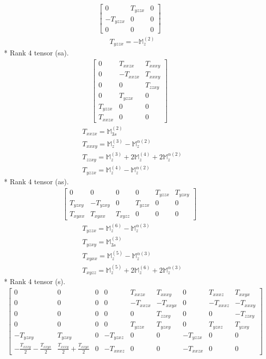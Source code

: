 \documentclass[fleqn,8pt,landscape]{jsarticle}
\begin{document}
\begin{align*}
\begin{bmatrix} 0 & T_{yzzx} & 0 \\ - T_{yzzx} & 0 & 0 \\ 0 & 0 & 0 \end{bmatrix}
\end{align*}
\begin{align*}
& T_{yzzx} = - \mathbb{M}_{z}^{(2)}
\end{align*}
* Rank 4 tensor (sa).
\begin{align*}
\begin{bmatrix} 0 & T_{xxzx} & T_{xxxy} \\ 0 & - T_{xxzx} & T_{xxxy} \\ 0 & 0 & T_{zzxy} \\ 0 & T_{yzzx} & 0 \\ T_{yzzx} & 0 & 0 \\ T_{xxzx} & 0 & 0 \end{bmatrix}
\end{align*}
\begin{align*}
& T_{xxzx} = \mathbb{M}_{3s}^{(2)} \\
& T_{xxxy} = \mathbb{M}_{z}^{(3)} - \mathbb{M}_{z}^{\alpha(2)} \\
& T_{zzxy} = \mathbb{M}_{z}^{(3)} + 2 \mathbb{M}_{z}^{(4)} + 2 \mathbb{M}_{z}^{\alpha(2)} \\
& T_{yzzx} = \mathbb{M}_{z}^{(4)} - \mathbb{M}_{z}^{\alpha(2)}
\end{align*}
* Rank 4 tensor (as).
\begin{align*}
\begin{bmatrix} 0 & 0 & 0 & 0 & T_{yzzx} & T_{yzxy} \\ T_{yzxy} & - T_{yzxy} & 0 & T_{yzzx} & 0 & 0 \\ T_{xyxx} & T_{xyxx} & T_{xyzz} & 0 & 0 & 0 \end{bmatrix}
\end{align*}
\begin{align*}
& T_{yzzx} = \mathbb{M}_{z}^{(6)} - \mathbb{M}_{z}^{\alpha(3)} \\
& T_{yzxy} = \mathbb{M}_{3s}^{(3)} \\
& T_{xyxx} = \mathbb{M}_{z}^{(5)} - \mathbb{M}_{z}^{\alpha(3)} \\
& T_{xyzz} = \mathbb{M}_{z}^{(5)} + 2 \mathbb{M}_{z}^{(6)} + 2 \mathbb{M}_{z}^{\alpha(3)}
\end{align*}
* Rank 4 tensor (s).
\begin{align*}
\begin{bmatrix} 0 & 0 & 0 & 0 & T_{xxzx} & T_{xxxy} & 0 & T_{xxxz} & T_{xxyx} \\ 0 & 0 & 0 & 0 & - T_{xxzx} & - T_{xxyx} & 0 & - T_{xxxz} & - T_{xxxy} \\ 0 & 0 & 0 & 0 & 0 & T_{zzxy} & 0 & 0 & - T_{zzxy} \\ 0 & 0 & 0 & 0 & T_{yzzx} & T_{yzxy} & 0 & T_{yzxz} & T_{yzxy} \\ - T_{yzxy} & T_{yzxy} & 0 & - T_{yzxz} & 0 & 0 & - T_{yzzx} & 0 & 0 \\ - \frac{T_{xxxy}}{2} - \frac{T_{xxyx}}{2} & \frac{T_{xxxy}}{2} + \frac{T_{xxyx}}{2} & 0 & - T_{xxxz} & 0 & 0 & - T_{xxzx} & 0 & 0 \end{bmatrix}
\end{align*}
\end{document}
